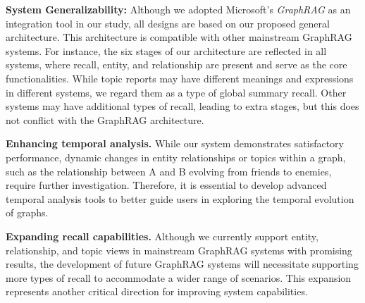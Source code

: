 
\textbf{System Generalizability:} Although we adopted Microsoft's \textit{GraphRAG} \cite{edge2024local} as an integration tool in our study, all designs are based on our proposed general architecture. This architecture is compatible with other mainstream GraphRAG systems. For instance, the six stages of our architecture are reflected in all systems, where recall, entity, and relationship are present and serve as the core functionalities. While topic reports may have different meanings and expressions in different systems, we regard them as a type of global summary recall. Other systems may have additional types of recall, leading to extra stages, but this does not conflict with the GraphRAG architecture.




\textbf{Enhancing temporal analysis.} While our system demonstrates satisfactory performance, dynamic changes in entity relationships or topics within a graph, such as the relationship between A and B evolving from friends to enemies, require further investigation. Therefore, it is essential to develop advanced temporal analysis tools to better guide users in exploring the temporal evolution of graphs.

\textbf{Expanding recall capabilities.} Although we currently support entity, relationship, and topic views in mainstream GraphRAG systems with promising results, the development of future GraphRAG systems will necessitate supporting more types of recall to accommodate a wider range of scenarios. This expansion represents another critical direction for improving system capabilities.

